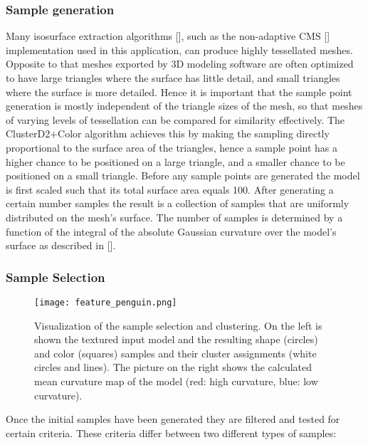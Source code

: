 \subsubsection{Sample generation}

Many isosurface extraction algorithms [], such as the non-adaptive CMS []
implementation used in this application, can produce highly tessellated meshes. Opposite to that meshes exported by
3D modeling software are often optimized to have large triangles where the surface has little detail, and small triangles where
the surface is more detailed. Hence it is important that the sample point generation is mostly independent of the triangle sizes
of the mesh, so that meshes of varying levels of tessellation can be compared for similarity effectively.
The ClusterD2+Color algorithm achieves this by making the sampling directly proportional to the surface area of the triangles, hence a sample point
has a higher chance to be positioned on a large triangle, and a smaller chance to be positioned on a small triangle.
Before any sample points are generated the model is first scaled such that its total surface area equals 100.
After generating a certain number samples the result is a collection of samples that are uniformly distributed on the mesh's surface. The number of samples
is determined by a function of the integral of the absolute Gaussian curvature over the model's surface as described in [].

\subsubsection{Sample Selection}

\begin{figure}
\centering
\captionsetup{width=0.8\textwidth}
\texttt{[image: feature\_penguin.png]}
\caption{Visualization of the sample selection and clustering. On the left is shown the textured input model and the resulting shape (circles) and color (squares) samples
and their cluster assignments (white circles and lines). The picture on the right shows the calculated mean curvature map of the model (red: high curvature, blue: low curvature).}
\label{fig:feature_penguin}
\end{figure}

Once the initial samples have been generated they are filtered and tested for certain criteria.
These criteria differ between two different types of samples:

